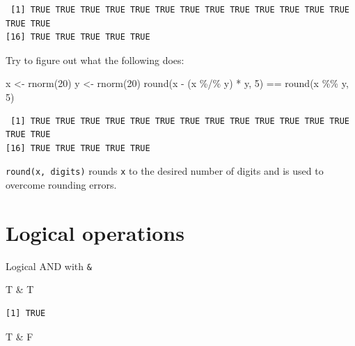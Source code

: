 \documentclass[
]{book}
\newenvironment{Shaded}{\begin{snugshade}}{\end{snugshade}}
\newcommand{\DecValTok}[1]{\textcolor[rgb]{0.00,0.00,0.81}{#1}}
\newcommand{\FunctionTok}[1]{\textcolor[rgb]{0.00,0.00,0.00}{#1}}
\newcommand{\NormalTok}[1]{#1}
\newcommand{\OtherTok}[1]{\textcolor[rgb]{0.56,0.35,0.01}{#1}}
\newcommand{\SpecialCharTok}[1]{\textcolor[rgb]{0.00,0.00,0.00}{#1}}
\begin{document}
\begin{verbatim}
 [1] TRUE TRUE TRUE TRUE TRUE TRUE TRUE TRUE TRUE TRUE TRUE TRUE TRUE TRUE TRUE
[16] TRUE TRUE TRUE TRUE TRUE
\end{verbatim}

Try to figure out what the following does:

\begin{Shaded}
\begin{Highlighting}[]
\NormalTok{x }\OtherTok{\textless{}{-}} \FunctionTok{rnorm}\NormalTok{(}\DecValTok{20}\NormalTok{)}
\NormalTok{y }\OtherTok{\textless{}{-}} \FunctionTok{rnorm}\NormalTok{(}\DecValTok{20}\NormalTok{)}
\FunctionTok{round}\NormalTok{(x }\SpecialCharTok{{-}}\NormalTok{ (x }\SpecialCharTok{\%/\%}\NormalTok{ y) }\SpecialCharTok{*}\NormalTok{ y, }\DecValTok{5}\NormalTok{) }\SpecialCharTok{==} \FunctionTok{round}\NormalTok{(x }\SpecialCharTok{\%\%}\NormalTok{ y, }\DecValTok{5}\NormalTok{)}
\end{Highlighting}
\end{Shaded}

\begin{verbatim}
 [1] TRUE TRUE TRUE TRUE TRUE TRUE TRUE TRUE TRUE TRUE TRUE TRUE TRUE TRUE TRUE
[16] TRUE TRUE TRUE TRUE TRUE
\end{verbatim}

\begin{rmdtip}
\texttt{round(x,\ digits)} rounds \texttt{x} to the desired number of
digits and is used to overcome rounding errors.
\end{rmdtip}

\hypertarget{logical-operations}{%
\section{Logical operations}\label{logical-operations}}

Logical AND with \texttt{\&}

\begin{Shaded}
\begin{Highlighting}[]
\NormalTok{T }\SpecialCharTok{\&}\NormalTok{ T}
\end{Highlighting}
\end{Shaded}

\begin{verbatim}
[1] TRUE
\end{verbatim}

\begin{Shaded}
\begin{Highlighting}[]
\NormalTok{T }\SpecialCharTok{\&}\NormalTok{ F}
\end{Highlighting}
\end{Shaded}
\end{document}
